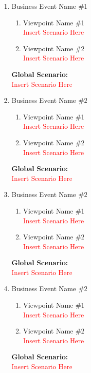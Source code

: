 \documentclass[]{article}
\begin{document}
\begin{enumerate}[{\bf {BE}1.}]

	\item Business Event Name \#1
		\begin{enumerate}[{\bf VP1.}]
			\item Viewpoint Name \#1 \\
				\textcolor{red}{Insert Scenario Here}
			\item Viewpoint Name \#2 \\
				\textcolor{red}{Insert Scenario Here}
		\end{enumerate}
		{\bf Global Scenario:}\\
		\textcolor{red}{Insert Scenario Here}

	\item Business Event Name \#2
	\begin{enumerate}[{\bf VP1.}]
		\item Viewpoint Name \#1 \\
		\textcolor{red}{Insert Scenario Here}
		\item Viewpoint Name \#2 \\
		\textcolor{red}{Insert Scenario Here}
	\end{enumerate}
	{\bf Global Scenario:}\\
	\textcolor{red}{Insert Scenario Here}

	\item Business Event Name \#2
	\begin{enumerate}[{\bf VP1.}]
		\item Viewpoint Name \#1 \\
		\textcolor{red}{Insert Scenario Here}
		\item Viewpoint Name \#2 \\
		\textcolor{red}{Insert Scenario Here}
	\end{enumerate}
	{\bf Global Scenario:}\\
	\textcolor{red}{Insert Scenario Here}

	\item Business Event Name \#2
	\begin{enumerate}[{\bf VP1.}]
		\item Viewpoint Name \#1 \\
		\textcolor{red}{Insert Scenario Here}
		\item Viewpoint Name \#2 \\
		\textcolor{red}{Insert Scenario Here}
	\end{enumerate}
	{\bf Global Scenario:}\\
	\textcolor{red}{Insert Scenario Here}


\end{enumerate}
\end{document}
